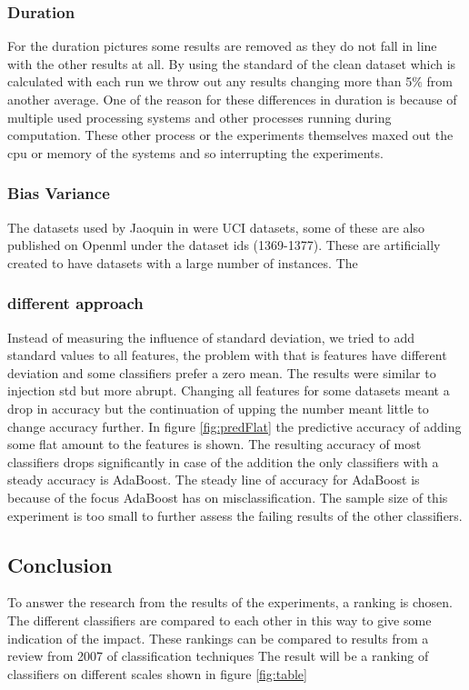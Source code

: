 \documentclass[a4paper,10pt]{article}
\begin{document}
\subsubsection{Duration}
For the duration pictures some results are removed as they do not fall in line with the other results at all. By using the standard of the clean dataset which is calculated with each run we throw out any results changing more than 5$\%$ from another average. One of the reason for these differences in duration is because of multiple used processing systems and other processes running during computation. These other process or the experiments themselves maxed out the cpu or memory of the systems and so interrupting the experiments.

\subsubsection{Bias Variance}
The datasets used by Jaoquin in \cite{Bias-var} were UCI datasets, some of these are also published on Openml under the dataset ids (1369-1377). These are artificially created to have datasets with a large number of instances. The 


\subsubsection{different approach}
Instead of measuring the influence of standard deviation, we tried to add standard values to all features, the problem with that is features have different deviation and some classifiers prefer a zero mean. The results were similar to injection std but more abrupt. Changing all features for some datasets meant a drop in accuracy but the continuation of upping the number meant little to change accuracy further. In figure \ref{fig:predFlat} the predictive accuracy of adding some flat amount to the features is shown. The resulting accuracy of most classifiers drops significantly in case of the addition the only classifiers with a steady accuracy is AdaBoost. The steady line of accuracy for AdaBoost is because of the focus AdaBoost has on misclassification. The sample size of this experiment is too small to further assess the failing results of the other classifiers.  


\subsection{Conclusion}
To answer the research from the results of the experiments, a ranking is chosen. The different classifiers are compared to each other in this way to give some indication of the impact.
These rankings can be compared to results from a review from 2007 of classification techniques \cite{RevClass}
The result will be a ranking of classifiers on different scales shown in figure \ref{fig:table}
\end{document}
